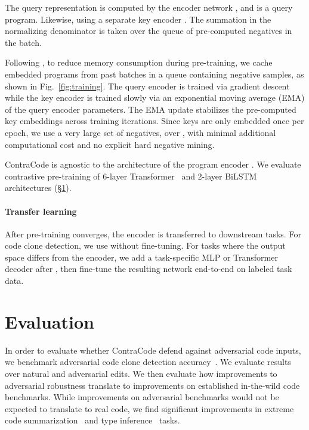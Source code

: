 \documentclass[11pt]{article}
\newcommand{\ours}[0]{ContraCode}
\begin{document}
The query representation  is computed by the encoder network , and  is a query program. Likewise,  using a separate key encoder .
The summation  in the normalizing denominator is taken over the queue of pre-computed negatives in the batch.

Following \citet{he2019momentum}, to reduce memory consumption during pre-training, we cache embedded programs from past batches in a queue containing negative samples, as shown in Fig.~\ref{fig:training}.
The query encoder  is trained via gradient descent while the key encoder  is trained slowly via an exponential moving average (EMA) of the query encoder parameters. The EMA update stabilizes the pre-computed key embeddings across training iterations. Since keys are only embedded once per epoch, we use a very large set of negatives, over , with minimal additional computational cost and no explicit hard negative mining.

\ours{} is agnostic to the architecture of the program encoder . We evaluate contrastive pre-training of 6-layer Transformer~\citep{vaswani2017attention} and 2-layer BiLSTM~\citep{schuster1997bidirectional, huang2015bidirectional} architectures (\S\ref{sec:experiments}).

\paragraph{Transfer learning} After pre-training converges, the encoder  is transferred to downstream tasks. For code clone detection, we use  without fine-tuning. For tasks where the output space differs from the encoder, we add a task-specific MLP or Transformer decoder after , then fine-tune the resulting network end-to-end on labeled task data.



\section{Evaluation}
\label{sec:experiments}
In order to evaluate whether \ours{} defend against adversarial code inputs, we benchmark adversarial code clone detection accuracy~\citep{Baker92aprogram}. We evaluate results over natural and adversarial edits. We then evaluate how improvements to adversarial robustness translate to improvements on established in-the-wild code benchmarks. While improvements on adversarial benchmarks would not be expected to translate to real code, we find significant improvements in extreme code summarization~\citep{allamanis2016convolutional} and type inference~\citep{hellendoorn2018deep} tasks.
\end{document}
